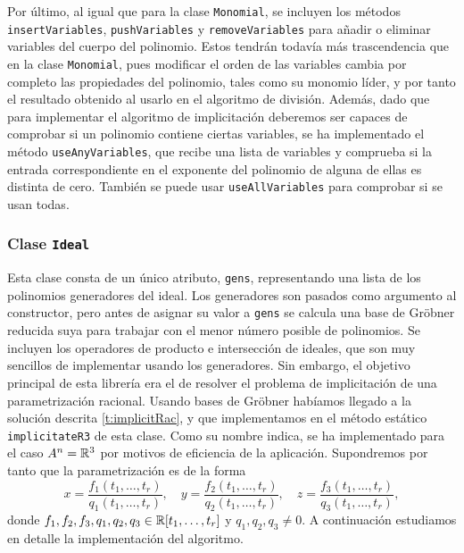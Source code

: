 Por último, al igual que para la clase \texttt{Monomial}, se incluyen los métodos  \texttt{insertVariables}, \texttt{pushVariables} y \texttt{removeVariables} para añadir o eliminar variables del cuerpo del polinomio. Estos tendrán todavía más trascendencia que en la clase \texttt{Monomial}, pues modificar el orden de las variables cambia por completo las propiedades del polinomio, tales como su monomio líder, y por tanto el resultado obtenido al usarlo en el algoritmo de división.  Además, dado que para implementar el algoritmo de implicitación deberemos ser capaces de comprobar si un polinomio contiene ciertas variables, se ha implementado el método \texttt{useAnyVariables}, que recibe una lista de variables y comprueba si la entrada correspondiente en el exponente del polinomio de alguna de ellas es distinta de cero. También se puede usar \texttt{useAllVariables} para comprobar si se usan todas.

\subsubsection{Clase \texttt{Ideal}}
Esta clase consta de un único atributo, \texttt{gens}, representando una lista de los polinomios generadores del ideal. Los generadores son pasados como argumento al constructor, pero antes de asignar su valor a \texttt{gens} se calcula una base de Gröbner reducida suya para trabajar con el menor número posible de polinomios. Se incluyen los operadores de producto e intersección de ideales, que son muy sencillos de implementar usando los generadores. Sin embargo, el objetivo principal de esta librería era el de resolver el problema de implicitación de una parametrización racional. Usando bases de Gröbner habíamos llegado a la solución descrita \autoref{t:implicitRac}, y que implementamos en el método estático \texttt{implicitateR3} de esta clase. Como su nombre indica, se ha implementado para el caso $A^n = \mathbb{R}^3$ por motivos de eficiencia de la aplicación. Supondremos por tanto que la parametrización es de la forma
\begin{equation*}
    x = \frac{f_1(t_1,\dots, t_r)}{q_1(t_1,\dots, t_r)},\quad
    y = \frac{f_2(t_1,\dots, t_r)}{q_2(t_1,\dots, t_r)},\quad
    z = \frac{f_3(t_1,\dots, t_r)}{q_3(t_1,\dots, t_r)},
\end{equation*}
donde $f_1,f_2,f_3,q_1,q_2,q_3 \in \mathbb{R}[t_1,\dots, t_r]$ y $q_1,q_2,q_3 \neq 0$. A continuación estudiamos en detalle la implementación del algoritmo.\newline

